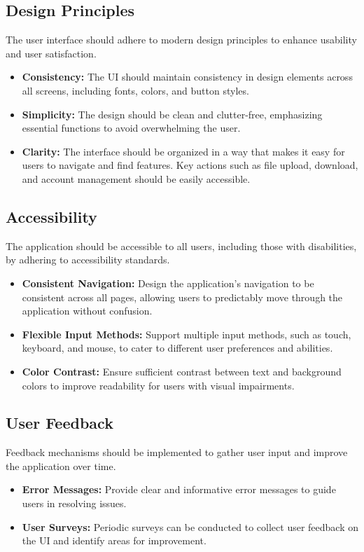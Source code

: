 \documentclass[12pt,a4paper]{report}
\begin{document}
   \subsection{Design Principles}
   The user interface should adhere to modern design principles to enhance usability and user satisfaction.
   \begin{itemize}
       \item \textbf{Consistency:} The UI should maintain consistency in design elements across all screens, including fonts, colors, and button styles.
       \item \textbf{Simplicity:} The design should be clean and clutter-free, emphasizing essential functions to avoid overwhelming the user.
       \item \textbf{Clarity:} The interface should be organized in a way that makes it easy for users to navigate and find features. Key actions such as file upload, download, and account management should be easily accessible.
   \end{itemize}
   
   \subsection{Accessibility}
   The application should be accessible to all users, including those with disabilities, by adhering to accessibility standards.
   \begin{itemize}
        \item \textbf{Consistent Navigation:} Design the application's navigation to be consistent across all pages, allowing users to predictably move through the application without confusion.
        \item \textbf{Flexible Input Methods:} Support multiple input methods, such as touch, keyboard, and mouse, to cater to different user preferences and abilities.
        \item \textbf{Color Contrast:} Ensure sufficient contrast between text and background colors to improve readability for users with visual impairments.
   \end{itemize}
   
   \subsection{User Feedback}
   Feedback mechanisms should be implemented to gather user input and improve the application over time.
   \begin{itemize}
       \item \textbf{Error Messages:} Provide clear and informative error messages to guide users in resolving issues.
       \item \textbf{User Surveys:} Periodic surveys can be conducted to collect user feedback on the UI and identify areas for improvement.
   \end{itemize}
   
\end{document}
